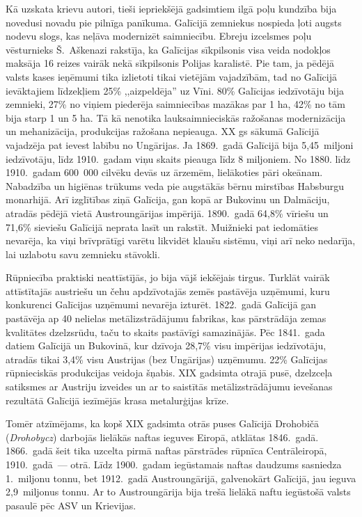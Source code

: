\documentclass[twoside,a5paper,12pt,fleqn,openany]{extbook}
\newcommand{\pltxti}[1]{\textit{\textpolish{#1}}}
\begin{document}
Kā uzskata krievu autori, tieši iepriekšējā gadsimtiem ilgā poļu kundzība bija novedusi novadu pie pilnīga panīkuma. Galīcijā zemniekus nospieda ļoti augsts nodevu slogs, kas neļāva modernizēt saimniecību. Ebreju izcelsmes poļu vēsturnieks Š.~Aškenazi rakstīja, ka Galīcijas sīkpilsonis visa veida nodokļos maksāja 16 reizes vairāk nekā sīkpilsonis Polijas karalistē. Pie tam, ja pēdējā valsts kases ieņēmumi tika izlietoti tikai vietējām vajadzībām, tad no Galīcijā ievāktajiem līdzekļiem 25\% ,,aizpeldēja'' uz Vīni. 80\% Galīcijas iedzīvotāju bija zemnieki, 27\% no viņiem piederēja saimniecības mazākas par 1 ha, 42\% no tām bija starp 1 un 5 ha. Tā kā nenotika lauksaimnieciskās ražošanas modernizācija un mehanizācija, produkcijas ražošana nepieauga. XX gs sākumā Galīcijā vajadzēja pat ievest labību no Ungārijas. Ja 1869.~gadā Galīcijā bija 5,45~miljoni iedzīvotāju, līdz 1910.~gadam viņu skaits pieauga līdz 8 miljoniem. No 1880. līdz 1910.~gadam 600~000 cilvēku devās uz ārzemēm, lielākoties pāri okeānam. Nabadzība un higiēnas trūkums veda pie augstākās bērnu mirstības Habsburgu monarhijā. Arī izglītības ziņā Galīcija, gan kopā ar Bukovinu un Dalmāciju, atradās pēdējā vietā Austroungārijas impērijā. 1890.~gadā 64,8\% vīriešu un 71,6\% sieviešu Galīcijā neprata lasīt un rakstīt. Muižnieki pat iedomāties nevarēja, ka viņi brīvprātīgi varētu likvidēt klaušu sistēmu, viņi arī neko nedarīja, lai uzlabotu savu zemnieku stāvokli.

Rūpniecība praktiski neattīstījās, jo bija vājš iekšējais tirgus. Turklāt vairāk attīstītajās austriešu un čehu apdzīvotajās zemēs pastāvēja uzņēmumi, kuru konkurenci Galīcijas uzņēmumi nevarēja izturēt. 1822.~gadā Galīcijā gan pastāvēja ap 40 nelielas metālizstrādājumu fabrikas, kas pārstrādāja zemas kvalitātes dzelzsrūdu, taču to skaits pastāvīgi samazinājās. Pēc 1841.~gada datiem Galīcijā un Bukovinā, kur dzīvoja 28,7\% visu impērijas iedzīvotāju, atradās tikai 3,4\% visu Austrijas (bez Ungārijas) uzņēmumu. 22\% Galīcijas rūpnieciskās produkcijas veidoja šņabis. XIX gadsimta otrajā pusē, dzelzceļa satiksmes ar Austriju izveides un ar to saistītās metālizstrādājumu ievešanas rezultātā Galīcijā iezīmējās krasa metalurģijas krīze.

Tomēr atzīmējams, ka kopš XIX gadsimta otrās puses Galīcijā Drohobičā (\pltxti{Drohobycz}) darbojās lielākās naftas ieguves Eiropā, atklātas 1846.~gadā. 1866.~gadā šeit tika uzcelta pirmā naftas pārstrādes rūpnīca Centrāleiropā, 1910.~gadā~--- otrā. Līdz 1900.~gadam iegūstamais naftas daudzums sasniedza 1.~miljonu tonnu, bet 1912.~gadā Austroungārijā, galvenokārt Galīcijā, jau ieguva 2,9~miljonus tonnu. Ar to Austroungārija bija trešā lielākā naftu iegūstošā valsts pasaulē pēc ASV un Krievijas.
\end{document}

